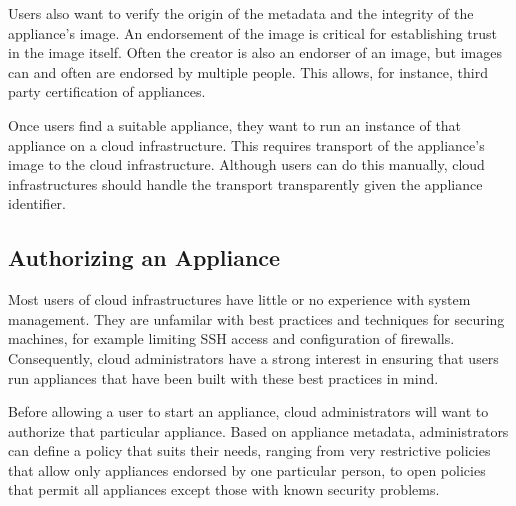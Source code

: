 Users also want to verify the origin of the metadata and the integrity
of the appliance's image.  An endorsement of the image is critical for
establishing trust in the image itself.  Often the creator is also an
endorser of an image, but images can and often are endorsed by
multiple people.  This allows, for instance, third party certification
of appliances.

Once users find a suitable appliance, they want to run an instance of
that appliance on a cloud infrastructure.  This requires transport of
the appliance's image to the cloud infrastructure.  Although users
can do this manually, cloud infrastructures should handle
the transport transparently given the appliance identifier.

\subsection{Authorizing an Appliance}

Most users of cloud infrastructures have little or no experience with
system management.  They are unfamilar with best practices and
techniques for securing machines, for example limiting SSH access and
configuration of firewalls.  Consequently, cloud administrators have a
strong interest in ensuring that users run appliances that have been
built with these best practices in mind.

Before allowing a user to start an appliance, cloud administrators
will want to authorize that particular appliance.  Based on appliance
metadata, administrators can define a policy that suits their needs,
ranging from very restrictive policies that allow only appliances endorsed by
one particular person, to open policies that permit all 
appliances except those with known security problems.
